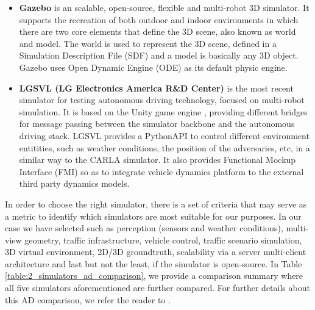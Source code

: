 \begin{itemize}
	\item \textbf{Gazebo} \cite{koenig2004design} is an scalable, open-source, flexible and multi-robot 3D simulator. It supports the recreation of both outdoor and indoor environments in which there are two core elements that define the 3D scene, also known as world and model. The world is used to represent the 3D scene, defined in a Simulation Description File (SDF) and a model is basically any 3D object. Gazebo uses Open Dynamic Engine (ODE) as its default physic engine.
	
	\item \textbf{LGSVL (LG Electronics America R\&D Center)} \cite{rong2020lgsvl} is the most recent simulator for testing autonomous driving technology, focused on multi-robot simulation. It is based on the Unity game engine \cite{haas2014history}, providing different bridges for message passing between the simulator backbone and the autonomous driving stack. LGSVL provides a PythonAPI to control different environment entitities, such as weather conditions, the position of the adversaries, etc, in a similar way to the \ac{CARLA} simulator. It also provides Functional Mockup Interface (FMI) so as to integrate vehicle dynamics platform to the external third party dynamics models.
	
\end{itemize}

In order to choose the right simulator, there is a set of criteria \cite{kaur2021survey} that may serve as a metric to identify which simulators are most suitable for our purposes. In our case we have selected such as perception (sensors and weather conditions), multi-view geometry, traffic infrastructure, vehicle control, traffic scenario simulation, 3D virtual environment, 2D/3D groundtruth, scalability via a server multi-client architecture and last but not the least, if the simulator is open-source. In Table \ref{table:2_simulators_ad_comparison}, we provide a comparison summary where all five simulators aforementioned are further compared. For further details about this \ac{AD} comparison, we refer the reader to \cite{kaur2021survey}.

